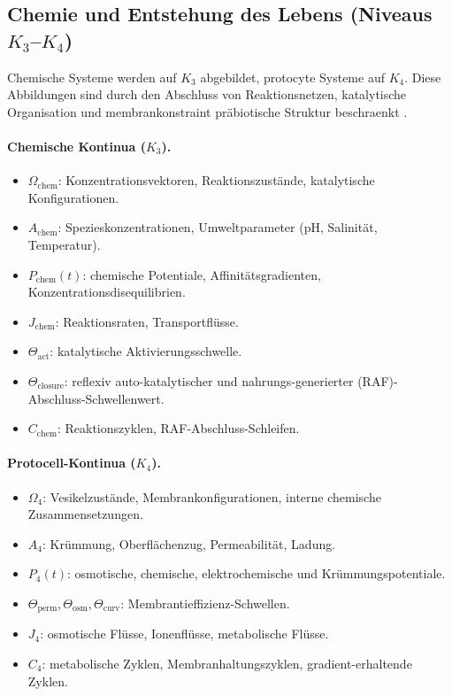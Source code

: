 \subsection{Chemie und Entstehung des Lebens (Niveaus \texorpdfstring{$K_3$}{K3}--\texorpdfstring{$K_4$}{K4})}

Chemische Systeme werden auf \(K_3\) abgebildet, protocyte Systeme auf
\(K_4\).
Diese Abbildungen sind durch den Abschluss von Reaktionsnetzen, katalytische
Organisation und membrankonstraint präbiotische Struktur beschraenkt
\parencite{kauffman_autocatalytic,raf_networks}.

\paragraph{Chemische Kontinua (\texorpdfstring{\(K_3\)}{K3}).}
\begin{itemize}
  \item \(\Omega_{\mathrm{chem}}\): Konzentrationsvektoren, Reaktionszustände,
        katalytische Konfigurationen.
  \item \(A_{\mathrm{chem}}\): Spezieskonzentrationen, Umweltparameter
        (pH, Salinität, Temperatur).
  \item \(P_{\mathrm{chem}}(t)\): chemische Potentiale, Affinitätsgradienten,
        Konzentrationsdisequilibrien.
  \item \(J_{\mathrm{chem}}\): Reaktionsraten, Transportflüsse.
  \item \(\Theta_{\mathrm{act}}\): katalytische Aktivierungsschwelle.
  \item \(\Theta_{\mathrm{closure}}\): reflexiv auto-katalytischer und
        nahrungs-generierter (RAF)-Abschluss-Schwellenwert.
  \item \(C_{\mathrm{chem}}\): Reaktionszyklen, RAF-Abschluss-Schleifen.
\end{itemize}

\paragraph{Protocell-Kontinua (\texorpdfstring{\(K_4\)}{K4}).}
\begin{itemize}
  \item \(\Omega_{4}\): Vesikelzustände, Membrankonfigurationen, interne
        chemische Zusammensetzungen.
  \item \(A_4\): Krümmung, Oberflächenzug, Permeabilität, Ladung.
  \item \(P_4(t)\): osmotische, chemische, elektrochemische und
        Krümmungspotentiale.
  \item \(\Theta_{\mathrm{perm}}, \Theta_{\mathrm{osm}}, \Theta_{\mathrm{curv}}\):
        Membrantieffizienz-Schwellen.
  \item \(J_4\): osmotische Flüsse, Ionenflüsse, metabolische Flüsse.
  \item \(C_4\): metabolische Zyklen, Membranhaltungszyklen,
        gradient-erhaltende Zyklen.
\end{itemize}

